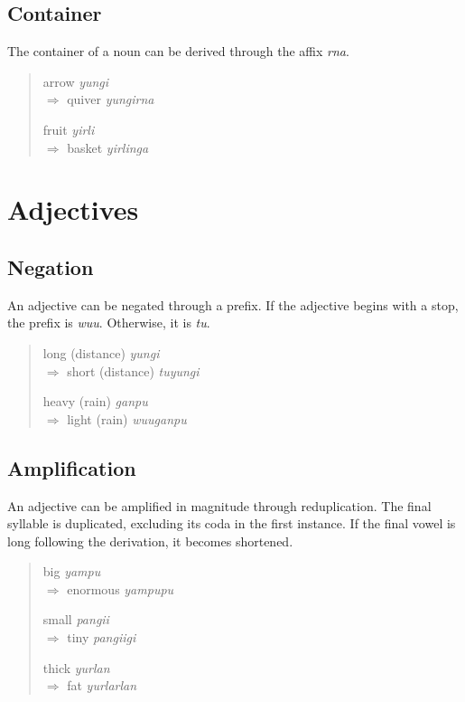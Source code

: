 \subsection{Container}

The container of a noun can be derived through the affix \textit{rna}.

\begin{quote}
\begin{multicols}{2}
arrow \textit{yungi}\\
$\Rightarrow$ quiver \textit{yungirna}

fruit \textit{yirli}\\
$\Rightarrow$ basket \textit{yirlinga}
\end{multicols}
\end{quote}

\section{Adjectives}

\subsection{Negation}

An adjective can be negated through a prefix. If the adjective begins with a
stop, the prefix is \textit{wuu}. Otherwise, it is \textit{tu}.

\begin{quote}
\begin{multicols}{2}
long (distance) \textit{yungi}\\
$\Rightarrow$ short (distance) \textit{tuyungi}

heavy (rain) \textit{ganpu}\\
$\Rightarrow$ light (rain) \textit{wuuganpu}
\end{multicols}
\end{quote}

\subsection{Amplification}

An adjective can be amplified in magnitude through reduplication. The final
syllable is duplicated, excluding its coda in the first instance. If the final
vowel is long following the derivation, it becomes shortened.

\begin{quote}
\begin{multicols}{3}
big \textit{yampu}\\
$\Rightarrow$ enormous \textit{yampupu}

small \textit{pangii}\\
$\Rightarrow$ tiny \textit{pangiigi}

thick \textit{yurlan}\\
$\Rightarrow$ fat \textit{yurlarlan}
\end{multicols}
\end{quote}